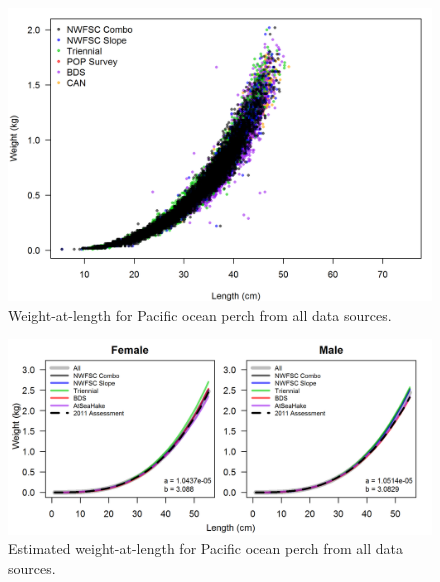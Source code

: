 \documentclass[12pt,]{article}
\begin{document}
\FloatBarrier 

\begin{figure}
\centering
\includegraphics{Figures/weightAtLengthBySource.png}
\caption{Weight-at-length for Pacific ocean perch from all data sources.
\label{fig:Wt_len}}
\end{figure}

\begin{figure}
\centering
\includegraphics{Figures/weightAtLengthPred.png}
\caption{Estimated weight-at-length for Pacific ocean perch from all
data sources. \label{fig:Wt_len_pred}}
\end{figure}
\end{document}
